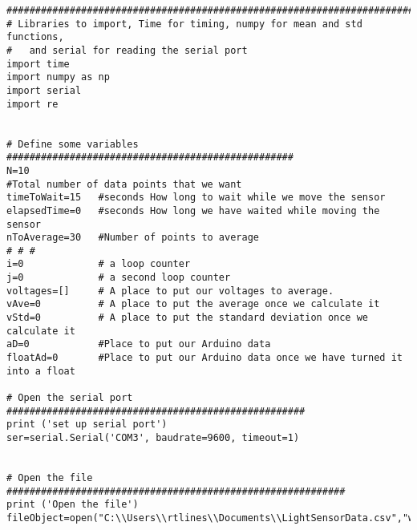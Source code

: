 \begin{verbatim}
##########################################################################
# Libraries to import, Time for timing, numpy for mean and std functions, 
#   and serial for reading the serial port
import time
import numpy as np
import serial
import re
 
 
# Define some variables ##################################################
N=10
#Total number of data points that we want
timeToWait=15   #seconds How long to wait while we move the sensor
elapsedTime=0   #seconds How long we have waited while moving the sensor
nToAverage=30   #Number of points to average
# # #
i=0             # a loop counter
j=0             # a second loop counter
voltages=[]     # A place to put our voltages to average.
vAve=0          # A place to put the average once we calculate it
vStd=0          # A place to put the standard deviation once we calculate it
aD=0            #Place to put our Arduino data 
floatAd=0       #Place to put our Arduino data once we have turned it into a float
 
# Open the serial port ####################################################
print ('set up serial port')
ser=serial.Serial('COM3', baudrate=9600, timeout=1)
 
 
# Open the file ###########################################################
print ('Open the file')
fileObject=open("C:\\Users\\rtlines\\Documents\\LightSensorData.csv","w")
 

\end{verbatim}
